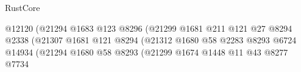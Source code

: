 \begin{lexlean}{RustCore}
\begin{coremodule}
                                                                @12120
                                                                (@21294
                                                                  @1683
                                                                  @123
                                                                  @8296
                                                                  (@21299
                                                                    @1681
                                                                    @211
                                                                    @121
                                                                    @27
                                                                    @8294
                                                                    @2338
                                                                    (@21307
                                                                      @1681
                                                                      @121
                                                                      @8294
                                                                      (@21312
                                                                        @1680
                                                                        @58
                                                                        @2283
                                                                        @8293
                                                                        @6724
                                                                        @14934
                                                                        (@21294
                                                                          @1680
                                                                          @58
                                                                          @8293
                                                                          (@21299
                                                                            @1674
                                                                            @1448
                                                                            @11
                                                                            @43
                                                                            @8277
                                                                            @7734

\end{coremodule}
\end{lexlean}
